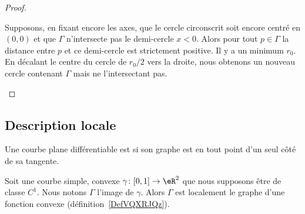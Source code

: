 \begin{proof}
\begin{subproof}
		Supposons, en fixant encore les axes, que le cercle circonscrit soit encore centré en \( (0,0)\) et que \( \Gamma\) n'intersecte pas le demi-cercle \( x<0\). Alors pour tout \( p\in \Gamma\) la distance entre \( p\) et ce demi-cercle est strictement positive. Il y a un minimum \( r_0\). En décalant le centre du cercle de \( r_0/2\) vers la droite, nous obtenons un nouveau cercle contenant \( \Gamma\) mais ne l'intersectant pas.
	\end{subproof}
\end{proof}

\subsection{Description locale}

\begin{definition}      \label{DEFooVQODooJSNYLw}
	Une courbe plane différentiable est  si son graphe est en tout point d'un seul côté de sa tangente.
\end{definition}

\begin{lemma}        \label{LEMooGEVEooHxPTMO}
	Soit une courbe simple, convexe \( \gamma\colon \mathopen[ 0 , 1 \mathclose]\to \eR^2\) que nous supposons être de classe \( C^1\). Nous notons \( \Gamma\) l'image de \( \gamma\). Alors \( \Gamma\) est localement le graphe d'une fonction convexe (définition~\ref{DefVQXRJQz}).
\end{lemma}

